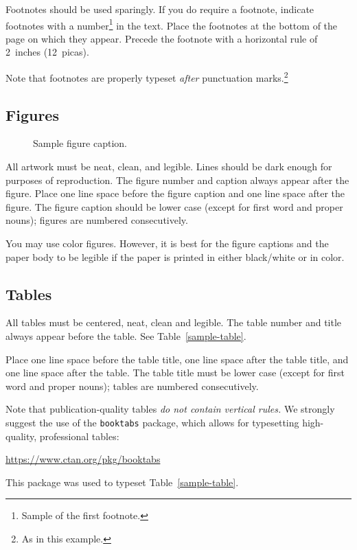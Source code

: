 \documentclass{article}
\begin{document}
Footnotes should be used sparingly.  If you do require a footnote, indicate
footnotes with a number\footnote{Sample of the first footnote.} in the
text. Place the footnotes at the bottom of the page on which they appear.
Precede the footnote with a horizontal rule of 2~inches (12~picas).

Note that footnotes are properly typeset \emph{after} punctuation
marks.\footnote{As in this example.}

\subsection{Figures}

\begin{figure}
  \centering
  \fbox{\rule[-.5cm]{0cm}{4cm} \rule[-.5cm]{4cm}{0cm}}
  \caption{Sample figure caption.}
\end{figure}

All artwork must be neat, clean, and legible. Lines should be dark enough for
purposes of reproduction. The figure number and caption always appear after the
figure. Place one line space before the figure caption and one line space after
the figure. The figure caption should be lower case (except for first word and
proper nouns); figures are numbered consecutively.

You may use color figures.  However, it is best for the figure captions and the
paper body to be legible if the paper is printed in either black/white or in
color.

\subsection{Tables}

All tables must be centered, neat, clean and legible.  The table number and
title always appear before the table.  See Table~\ref{sample-table}.

Place one line space before the table title, one line space after the
table title, and one line space after the table. The table title must
be lower case (except for first word and proper nouns); tables are
numbered consecutively.

Note that publication-quality tables \emph{do not contain vertical rules.} We
strongly suggest the use of the \verb+booktabs+ package, which allows for
typesetting high-quality, professional tables:
\begin{center}
  \url{https://www.ctan.org/pkg/booktabs}
\end{center}
This package was used to typeset Table~\ref{sample-table}.
\end{document}
